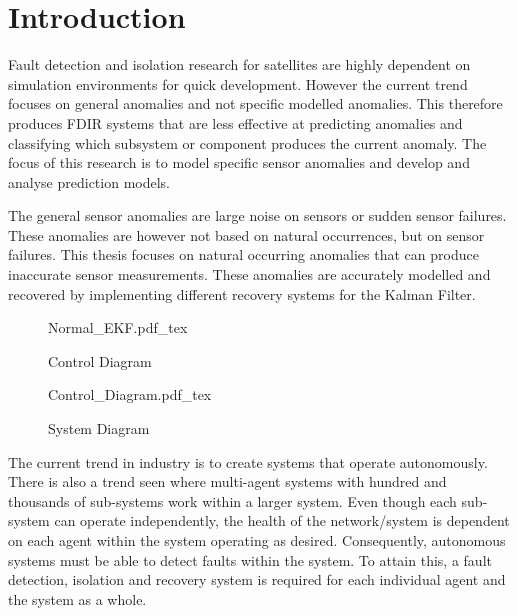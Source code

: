 %
%


\chapter{Introduction}
\label{chap:Introduction}

Fault detection and isolation research for satellites are highly dependent on simulation environments for quick development. However the current trend focuses on general anomalies and not specific modelled anomalies. This therefore produces FDIR systems that are less effective at predicting anomalies and classifying which subsystem or component produces the current anomaly. The focus of this research is to model specific sensor anomalies and develop and analyse prediction models. 

The general sensor anomalies are large noise on sensors or sudden sensor failures. These anomalies are however not based on natural occurrences, but on sensor failures. This thesis focuses on natural occurring anomalies that can produce inaccurate sensor measurements. These anomalies are accurately modelled and recovered by implementing different recovery systems for the Kalman Filter. 

\begin{figure}[h!b!t]
	\centering
	\def\svgwidth{14cm}
	{Normal_EKF.pdf_tex}
	\caption{Control Diagram}
	\label{fig:Control_Diagram}
\end{figure}


\begin{figure}[h!b!t]
	\centering
	\def\svgwidth{14cm}
	{Control_Diagram.pdf_tex}
	\caption{System Diagram}
	\label{fig:System_Diagram}
\end{figure}


The current trend in industry is to create systems that operate autonomously. There is also a trend seen where multi-agent systems with hundred and thousands of sub-systems work within a larger system. Even though each sub-system can operate independently, the health of the network/system is dependent on each agent within the system operating as desired. Consequently, autonomous systems must be able to detect faults within the system. To attain this, a fault detection, isolation and recovery system is required for each individual agent and the system as a whole.

